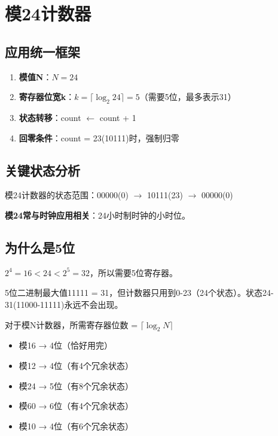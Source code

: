 \chapter{模24计数器}

\section{应用统一框架}

\begin{enumerate}
  \item \textbf{模值N}：$N = 24$
  \item \textbf{寄存器位宽k}：$k = \lceil \log_2 24 \rceil = 5$（需要5位，最多表示31）
  \item \textbf{状态转移}：count $\leftarrow$ count + 1
  \item \textbf{回零条件}：count = 23(10111)时，强制归零
\end{enumerate}

\section{关键状态分析}

模24计数器的状态范围：00000(0) $\to$ 10111(23) $\to$ 00000(0)

\textbf{模24常与时钟应用相关}：24小时制时钟的小时位。

\begin{center}
\end{center}

\section{为什么是5位}

$2^4 = 16 < 24 < 2^5 = 32$，所以需要5位寄存器。

5位二进制最大值11111 = 31，但计数器只用到0-23（24个状态）。状态24-31(11000-11111)永远不会出现。

\begin{examtip}[位宽确定公式]
对于模N计数器，所需寄存器位数 = $\lceil \log_2 N \rceil$

\begin{itemize}
  \item 模16 → 4位（恰好用完）
  \item 模12 → 4位（有4个冗余状态）
  \item 模24 → 5位（有8个冗余状态）
  \item 模60 → 6位（有4个冗余状态）
  \item 模10 → 4位（有6个冗余状态）
\end{itemize}
\end{examtip}

